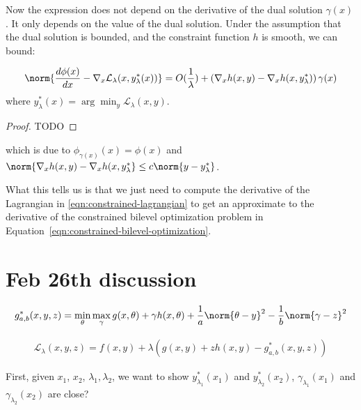 Now the expression does not depend on the derivative of the dual solution $\gamma(x)$. It only depends on the value of the dual solution. Under the assumption that the dual solution is bounded, and the constraint function $h$ is smooth, we can bound:
\begin{theorem}
    \begin{align}
    \norm{\frac{d \phi(x)}{d x} - \nabla_x \mathcal{L}_{\lambda}(x, y^*_{\lambda}(x))} = O(\frac{1}{\lambda}) + \left(\nabla_x h(x,y) - \nabla_x h(x,y^*_{\lambda})\right) \gamma(x)
    \end{align}
    where $y^*_{\lambda}(x) = \arg\min_y \mathcal{L}_{\lambda}(x, y)$.
\end{theorem}
\begin{proof}
    TODO
\end{proof}
which is due to $\phi_{\gamma(x)}(x) = \phi(x)$ and $\norm{\nabla_x h(x,y) - \nabla_x h(x,y^*_{\lambda}} \leq c \norm{y - y^*_{\lambda}}$.

What this tells us is that we just need to compute the derivative of the Lagrangian in \cref{eqn:constrained-lagrangian} to get an approximate to the derivative of the constrained bilevel optimization problem in Equation~\ref{eqn:constrained-bilevel-optimization}.



\section{Feb 26th discussion}

\begin{align}
    g_{a,b}^*(x,y,z) = \min_{\theta} \max_{\gamma} g(x,\theta) + \gamma h(x,\theta) + \frac{1}{a} \norm{\theta - y}^2 - \frac{1}{b} \norm{\gamma - z}^2
\end{align}

\begin{align}
    \mathcal{L}_\lambda(x,y,z) = f(x,y) + \lambda (g(x,y) + z h(x,y) - g_{a,b}^*(x,y,z))
\end{align}

First, given $x_1$, $x_2$, $\lambda_1, \lambda_2$, we want to show $y^*_{\lambda_1}(x_1)$ and $y^*_{\lambda_2}(x_2)$, $\gamma_{\lambda_1}(x_1)$ and $\gamma_{\lambda_2}(x_2)$ are close?


